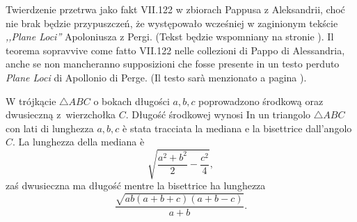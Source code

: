 Twierdzenie przetrwa jako fakt VII.122 w zbiorach Pappusa z Aleksandrii, choć nie brak będzie przypuszczeń, że występowało wcześniej w zaginionym tekście \emph{,,Plane Loci''} Apoloniusza z Pergi. %
(Tekst będzie wspomniany na stronie \pageref{plane_loci}). %
Il teorema sopravvive come fatto VII.122 nelle collezioni di Pappo di Alessandria, anche se non mancheranno supposizioni che fosse presente in un testo perduto \emph{Plane Loci} di Apollonio di Perge. %
(Il testo sarà menzionato a pagina \pageref{plane_loci}). %

\begin{corollary}
	W trójkącie $\triangle ABC$ o bokach długości $a, b, c$ poprowadzono środkową oraz dwusieczną z~wierzchołka $C$. %
	Długość środkowej wynosi %
	In un triangolo $\triangle ABC$ con lati di lunghezza $a, b, c$ è stata tracciata la mediana e la bisettrice dall'angolo $C$. %
	La lunghezza della mediana è %
	\begin{equation}
		\sqrt{\frac{a^2 + b^2}{2} - \frac{c^2}{4}},
	\end{equation}
	zaś dwusieczna ma długość %
	mentre la bisettrice ha lunghezza %
	\begin{equation}
		\frac{\sqrt{ab (a+b+c)(a+b-c)}}{a+b}.
	\end{equation}
\end{corollary}

%